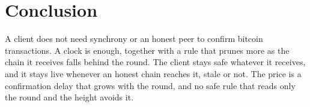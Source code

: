 \section{Conclusion}
\label{sec.conclusion}

A client does not need synchrony or an honest peer to confirm bitcoin
transactions. A clock is enough, together with a rule that prunes more as the
chain it receives falls behind the round. The client stays safe whatever it
receives, and it stays live whenever an honest chain reaches it, stale or not. The price
is a confirmation delay that grows with the round, and no safe rule that reads
only the round and the height avoids it.

